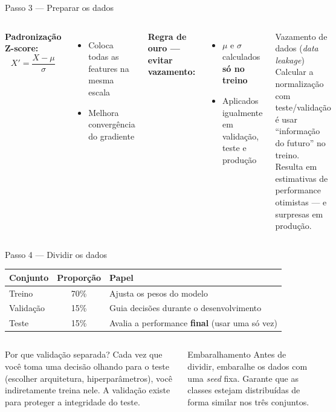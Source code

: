 \documentclass[aspectratio=169]{beamer}
\begin{document}
\begin{frame}{Passo 3 — Preparar os dados}
\begin{columns}
\textbf{Padronização Z-score:}
\[
  X' = \frac{X - \mu}{\sigma}
\]
\begin{itemize}
  \item Coloca todas as features na mesma escala
  \item Melhora convergência do gradiente
\end{itemize}
\vspace{8pt}
\textbf{Regra de ouro — evitar vazamento:}
\begin{itemize}
  \item $\mu$ e $\sigma$ calculados \textbf{só no treino}
  \item Aplicados igualmente em validação, teste e produção
\end{itemize}
\begin{alertblock}{Vazamento de dados (\textit{data leakage})}
  Calcular a normalização com teste/validação é usar ``informação do futuro'' no treino.\\[4pt]
  Resulta em estimativas de performance otimistas — e surpresas em produção.
\end{alertblock}
\end{columns}
\end{frame}

\begin{frame}{Passo 4 — Dividir os dados}
\begin{center}
\begin{tabular}{lcl}
  \toprule
  \textbf{Conjunto} & \textbf{Proporção} & \textbf{Papel} \\
  \midrule
  Treino     & 70\% & Ajusta os pesos do modelo \\
  Validação  & 15\% & Guia decisões durante o desenvolvimento \\
  Teste      & 15\% & Avalia a performance \textbf{final} (usar uma só vez) \\
  \bottomrule
\end{tabular}
\end{center}
\vfill
\begin{columns}
\begin{block}{Por que validação separada?}
  Cada vez que você toma uma decisão olhando para o teste (escolher arquitetura, hiperparâmetros), você indiretamente treina nele.
  A validação existe para proteger a integridade do teste.
\end{block}
\begin{block}{Embaralhamento}
  Antes de dividir, embaralhe os dados com uma \textit{seed} fixa.
  Garante que as classes estejam distribuídas de forma similar nos três conjuntos.
\end{block}
\end{columns}
\end{frame}
\end{document}
